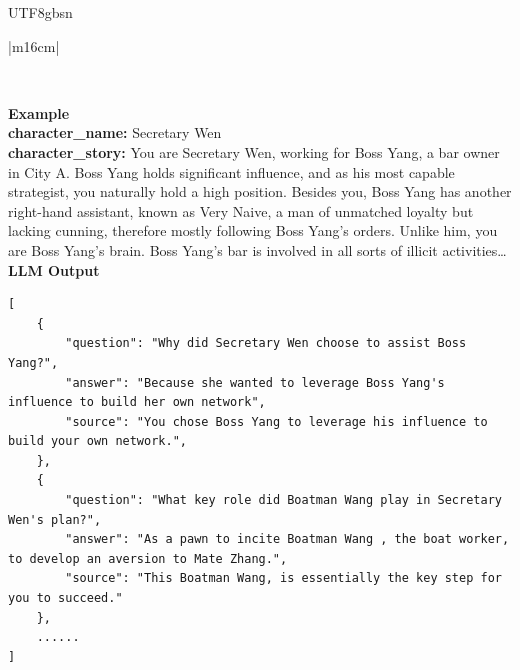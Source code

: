 \documentclass[11pt]{article}
\begin{document}
{\begin{CJK}{UTF8}{gbsn}
\begin{table}[ht!]
\begin{minipage}[t]{\linewidth}
\begin{tabular}{|m{16cm}|}
\begin{minipage}[t]{\linewidth}
\begin{verbatim}
\end{verbatim}
\end{minipage} \\
\hline
{}  \textbf{Example}  \\
 \textbf{  character\_name:} \small Secretary Wen  \\
  \textbf{  character\_story:} \small You are Secretary Wen, working for Boss Yang, a bar owner in City A. Boss Yang holds significant influence, and as his most capable strategist, you naturally hold a high position. Besides you, Boss Yang has another right-hand assistant, known as Very Naive, a man of unmatched loyalty but lacking cunning, therefore mostly following Boss Yang's orders. Unlike him, you are Boss Yang's brain. Boss Yang's bar is involved in all sorts of illicit activities…\\

\hline
{}  \textbf{LLM Output}  \\
\hline
\begin{minipage}[t]{\linewidth}
\small\begin{verbatim}
[
    {
        "question": "Why did Secretary Wen choose to assist Boss Yang?",
        "answer": "Because she wanted to leverage Boss Yang's influence to build her own network",
        "source": "You chose Boss Yang to leverage his influence to build your own network.",
    },
    {
        "question": "What key role did Boatman Wang play in Secretary Wen's plan?",
        "answer": "As a pawn to incite Boatman Wang , the boat worker, to develop an aversion to Mate Zhang.",
        "source": "This Boatman Wang, is essentially the key step for you to succeed."
    },
    ......
]

\end{verbatim}
\end{minipage} \\
\hline
\hline


\end{tabular}
\end{minipage}
\end{table}
\end{CJK}}
\end{document}
